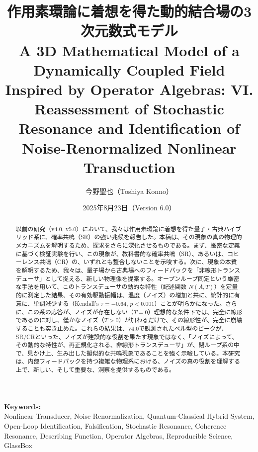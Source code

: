 \documentclass[a4paper,11pt,ja=standard,lualatex]{bxjsarticle}
\title{作用素環論に着想を得た動的結合場の3次元数式モデル\\
\large A 3D Mathematical Model of a Dynamically Coupled Field Inspired by Operator Algebras: VI. Reassessment of Stochastic Resonance and Identification of Noise-Renormalized Nonlinear Transduction}
\author[1]{今野聖也（Toshiya Konno）}
\affil[1]{Independent Researcher}
\affil[ ]{\href{mailto:ktlifeisonlyreallyoverafter60@gmail.com}{ktlifeisonlyreallyoverafter60@gmail.com}}
\affil[ ]{ORCID iD: \href{https://orcid.org/0009-0007-8916-3023}{0009-0007-8916-3023}}
\date{2025年8月23日（Version 6.0）}
\begin{document}
\maketitle

\noindent\textbf{Keywords:}\\
Nonlinear Transducer, Noise Renormalization, Quantum-Classical Hybrid System, Open-Loop Identification, Falsification, Stochastic Resonance, Coherence Resonance, Describing Function, Operator Algebras, Reproducible Science, GlassBox

\begin{abstract}
\noindent
以前の研究（v4.0, v5.0）において、我々は作用素環論に着想を得た量子・古典ハイブリッド系に、確率共鳴（SR）の強い兆候を報告した。本稿は、その現象の真の物理的メカニズムを解明するため、探求をさらに深化させるものである。まず、厳密な定義に基づく検証実験を行い、この現象が、教科書的な確率共鳴（SR）、あるいは、コヒーレンス共鳴（CR）の、いずれとも整合しないことを示唆する\cite{Gammaitoni1998,Lindner2004}。次に、現象の本質を解明するため、我々は、量子場から古典場へのフィードバックを「非線形トランスデューサ」として捉える、新しい物理像を提案する。オープンループ同定という厳密な手法を用いて、このトランスデューサの動的な特性（記述関数 $N(A,T)$）を定量的に測定した結果、その有効駆動振幅は、温度（ノイズ）の増加と共に、統計的に有意に、単調減少する（Kendall's $\tau=-0.64$, $p<0.001$）ことが明らかになった\cite{Kendall1938,Sen1968,Efron1979}。さらに、この系の応答が、ノイズが存在しない（$T=0$）理想的な条件下では、完全に線形であるのに対し、僅かなノイズ（$T>0$）が加わるだけで、その線形性が、完全に崩壊することも突き止めた。これらの結果は、v4.0で観測されたベル型のピークが、SR/CRといった、ノイズが建設的な役割を果たす現象ではなく、「ノイズによって、その動的な特性が、再正規化される、非線形トランスデューサ」が、閉ループ系の中で、見かけ上、生み出した擬似的な共鳴現象であることを強く示唆している。本研究は、内部フィードバックを持つ複雑な物理系における、ノイズの真の役割を理解する上で、新しい、そして重要な、洞察を提供するものである。
\end{abstract}

\vspace{1em}
\end{document}

